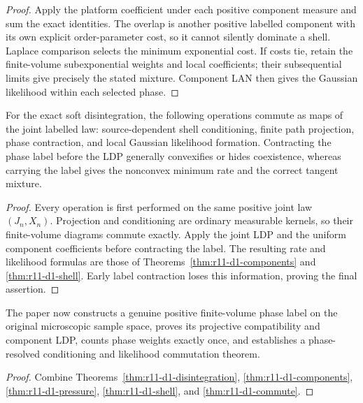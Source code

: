 \begin{proof}
Apply the platform coefficient under each positive component measure and sum
the exact identities.  The overlap is another positive labelled component
with its own explicit order-parameter cost, so it cannot silently dominate a
shell.  Laplace comparison selects the minimum exponential cost.  If costs tie,
retain the finite-volume subexponential weights and local coefficients; their
subsequential limits give precisely the stated mixture.  Component LAN then
gives the Gaussian likelihood within each selected phase.
\end{proof}

\begin{theorem}
\label{thm:r11-d1-commute}
For the exact soft disintegration, the following operations commute as maps of
the joint labelled law: source-dependent shell conditioning, finite path
projection, phase contraction, and local Gaussian likelihood formation.
Contracting the phase label before the LDP generally convexifies or hides
coexistence, whereas carrying the label gives the nonconvex minimum rate and
the correct tangent mixture.
\end{theorem}

\begin{proof}
Every operation is first performed on the same positive joint law
$(J_n,X_n)$.  Projection and conditioning are ordinary measurable kernels,
so their finite-volume diagrams commute exactly.  Apply the joint LDP and the
uniform component coefficients before contracting the label.  The resulting
rate and likelihood formulas are those of
Theorems~\ref{thm:r11-d1-components} and \ref{thm:r11-d1-shell}.  Early label
contraction loses this information, proving the final assertion.
\end{proof}

\begin{theorem}
\label{thm:r11-d1-main}
The paper now constructs a genuine positive finite-volume phase label on the
original microscopic sample space, proves its projective compatibility and
component LDP, counts phase weights exactly once, and establishes a
phase-resolved conditioning and likelihood commutation theorem.
\end{theorem}

\begin{proof}
Combine Theorems~\ref{thm:r11-d1-disintegration},
\ref{thm:r11-d1-components}, \ref{thm:r11-d1-pressure},
\ref{thm:r11-d1-shell}, and \ref{thm:r11-d1-commute}.
\end{proof}
